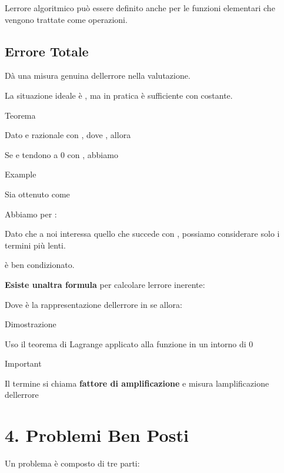 \documentclass[
]{article}
\begin{document}
L\textquotesingle errore algoritmico può essere definito anche per le
funzioni elementari che vengono trattate come operazioni.

\hypertarget{errore-totale}{%
\subsection{Errore Totale}\label{errore-totale}}

{}Dà una misura genuina dell\textquotesingle errore nella valutazione.

La situazione ideale è {}, ma in pratica è sufficiente {} con {}
costante.

Teorema

Dato {} e {} razionale con {}, dove {}, allora

{}

Se {} e {} tendono a 0 con {}, abbiamo\\
{}

Example

Sia {} ottenuto come\\
{}

Abbiamo per {}:

{}{}

Dato che a noi interessa quello che succede con {}, possiamo considerare
solo i termini più lenti.

{}

è ben condizionato.

\textbf{Esiste un\textquotesingle altra formula} per calcolare
l\textquotesingle errore inerente:

{}

Dove {} è la rappresentazione dell\textquotesingle errore in {} se {}
allora:\\
{}

Dimostrazione

Uso il teorema di Lagrange applicato alla funzione in un intorno di 0

{}

Important

Il termine {} si chiama \textbf{fattore di amplificazione} e misura
l\textquotesingle amplificazione dell\textquotesingle errore

\hypertarget{problemi-ben-posti}{%
\section{4. Problemi Ben Posti}\label{problemi-ben-posti}}

Un problema è composto di tre parti:
\end{document}

